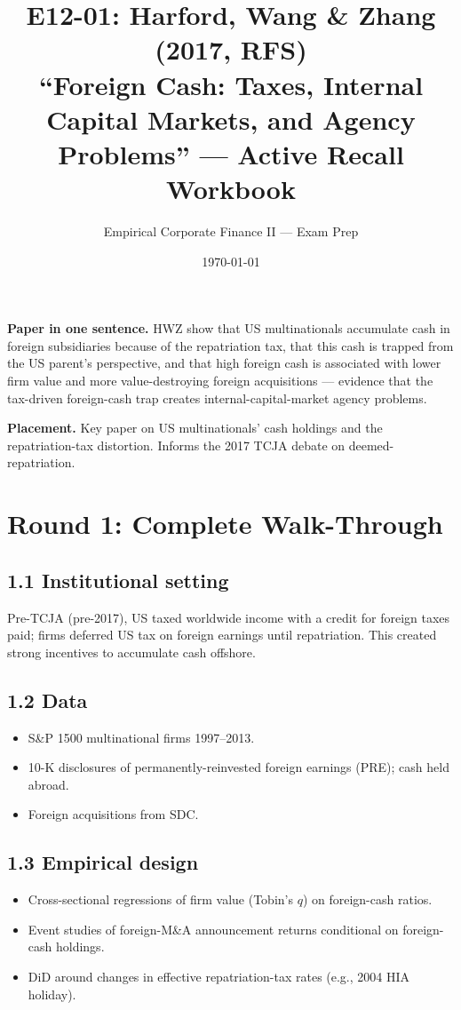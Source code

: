 \documentclass[11pt]{article}
\title{E12-01: Harford, Wang \& Zhang (2017, RFS) \\
\large ``Foreign Cash: Taxes, Internal Capital Markets, and Agency Problems'' --- Active Recall Workbook}
\author{Empirical Corporate Finance II --- Exam Prep}
\date{\today}
\begin{document}
\maketitle

\begin{keybox}
\textbf{Paper in one sentence.} HWZ show that US multinationals accumulate cash in foreign subsidiaries because of the repatriation tax, that this cash is trapped from the US parent's perspective, and that high foreign cash is associated with lower firm value and more value-destroying foreign acquisitions --- evidence that the tax-driven foreign-cash trap creates internal-capital-market agency problems.

\textbf{Placement.} Key paper on US multinationals' cash holdings and the repatriation-tax distortion. Informs the 2017 TCJA debate on deemed-repatriation.
\end{keybox}

\section*{Round 1: Complete Walk-Through}

\subsection*{1.1 Institutional setting}
Pre-TCJA (pre-2017), US taxed worldwide income with a credit for foreign taxes paid; firms deferred US tax on foreign earnings until repatriation. This created strong incentives to accumulate cash offshore.

\subsection*{1.2 Data}
\begin{itemize}
\item S\&P 1500 multinational firms 1997--2013.
\item 10-K disclosures of permanently-reinvested foreign earnings (PRE); cash held abroad.
\item Foreign acquisitions from SDC.
\end{itemize}

\subsection*{1.3 Empirical design}
\begin{itemize}
\item Cross-sectional regressions of firm value (Tobin's $q$) on foreign-cash ratios.
\item Event studies of foreign-M\&A announcement returns conditional on foreign-cash holdings.
\item DiD around changes in effective repatriation-tax rates (e.g., 2004 HIA holiday).
\end{itemize}
\end{document}
